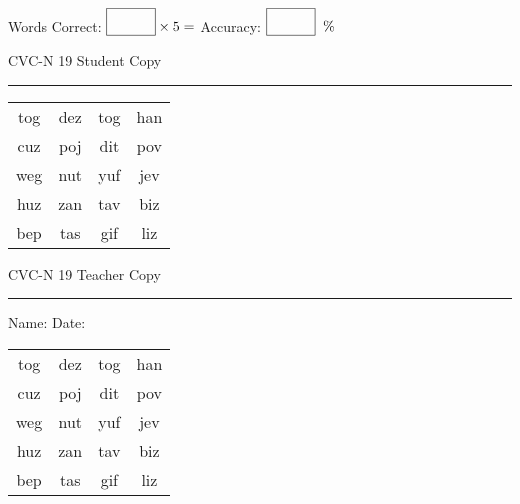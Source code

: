 \documentclass{memoir}
\begin{document}
\small

Words Correct: $\fbox{\phantom{\huge 100}} \times 5 = $ Accuracy: $\fbox{\phantom{\huge 100}}\;\; \%$ 

\vfill

\newpage


\footnotesize \noindent
CVC-N 19 \hfill Student Copy
\smallskip
\hrule

\Large

\setlength{\tabcolsep}{14pt}
\def\arraystretch{2}

{\selectfont


\begin{vplace}[0.5]
\begin{center}
\begin{tabular}{cccc}
tog & dez & tog & han \\
cuz & poj & dit & pov \\
weg & nut & yuf & jev \\
huz & zan & tav & biz \\
bep & tas & gif & liz \\
\end{tabular}
\end{center}
\end{vplace}

}

\newpage

\footnotesize \noindent
CVC-N 19 \hfill Teacher Copy
\smallskip
\hrule

\small

\vfill

\noindent
Name: \underline{\hspace{1.75in}} \hfill Date: \underline{\hspace{1in}}

\Large

{\selectfont


\begin{vplace}[0.5]
\begin{center}
\begin{tabular}{cccc}
tog & dez & tog & han \\
cuz & poj & dit & pov \\
weg & nut & yuf & jev \\
huz & zan & tav & biz \\
bep & tas & gif & liz \\
\end{tabular}
\end{center}
\end{vplace}



}
\end{document}
